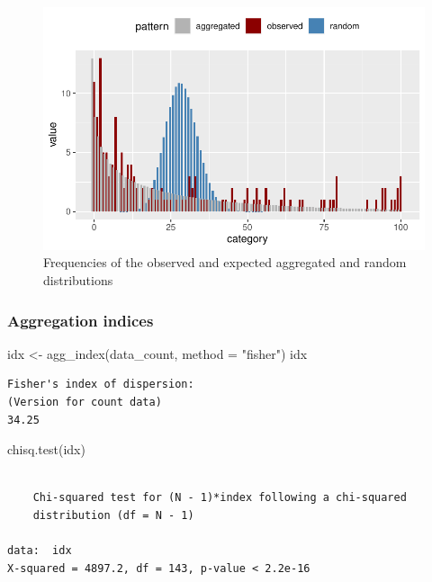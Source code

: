 \documentclass[
  letterpaper,
  DIV=11,
  numbers=noendperiod]{scrreprt}
\newenvironment{Shaded}{\begin{snugshade}}{\end{snugshade}}
\newcommand{\AttributeTok}[1]{\textcolor[rgb]{0.40,0.45,0.13}{#1}}
\newcommand{\FunctionTok}[1]{\textcolor[rgb]{0.28,0.35,0.67}{#1}}
\newcommand{\NormalTok}[1]{\textcolor[rgb]{0.00,0.23,0.31}{#1}}
\newcommand{\OtherTok}[1]{\textcolor[rgb]{0.00,0.23,0.31}{#1}}
\newcommand{\StringTok}[1]{\textcolor[rgb]{0.13,0.47,0.30}{#1}}
\begin{document}
\begin{figure}[H]

{\centering \includegraphics{spatial-tests_files/figure-pdf/fig-freq1-1.pdf}

}

\caption{\label{fig-freq1}Frequencies of the observed and expected
aggregated and random distributions}

\end{figure}

\hypertarget{aggregation-indices}{%
\subsubsection{Aggregation indices}\label{aggregation-indices}}

\begin{Shaded}
\begin{Highlighting}[]
\NormalTok{idx }\OtherTok{\textless{}{-}} \FunctionTok{agg\_index}\NormalTok{(data\_count, }\AttributeTok{method =} \StringTok{"fisher"}\NormalTok{)}
\NormalTok{idx}
\end{Highlighting}
\end{Shaded}

\begin{verbatim}
Fisher's index of dispersion:
(Version for count data)
34.25
\end{verbatim}

\begin{Shaded}
\begin{Highlighting}[]
\FunctionTok{chisq.test}\NormalTok{(idx)}
\end{Highlighting}
\end{Shaded}

\begin{verbatim}

    Chi-squared test for (N - 1)*index following a chi-squared
    distribution (df = N - 1)

data:  idx
X-squared = 4897.2, df = 143, p-value < 2.2e-16
\end{verbatim}
\end{document}
